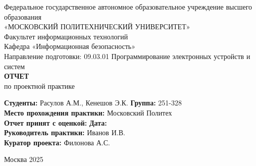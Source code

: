 \documentclass[14pt, a4paper]{extarticle}
\begin{document}
\begin{titlepage}
\begin{center}
    Федеральное государственное автономное образовательное учреждение высшего образования\\
    «МОСКОВСКИЙ ПОЛИТЕХНИЧЕСКИЙ УНИВЕРСИТЕТ»\\[1cm]
    Факультет информационных технологий\\
    Кафедра «Информационная безопасность»\\[1cm]
    Направление подготовки: 09.03.01 Программирование электронных устройств и систем\\[2cm]
    
    {\Large \textbf{ОТЧЕТ}}\\
    {\large по проектной практике}\\[2cm]
\end{center}

\begin{flushleft}
    \textbf{Студенты:} Расулов А.М., Кенешов Э.К. \hspace{1cm} \textbf{Группа:} 251-328\\[0.5cm]
    \textbf{Место прохождения практики:} Московский Политех\\[0.5cm]
    \textbf{Отчет принят с оценкой:} \underline{\hspace{4cm}} \textbf{Дата:} \underline{\hspace{4cm}}\\[0.5cm]
    \textbf{Руководитель практики:} Иванов И.В.\\[0.5cm]
    \textbf{Куратор проекта:} Филонова А.С.\\
\end{flushleft}

\vfill
\begin{center}
    Москва 2025
\end{center}
\end{titlepage}

\tableofcontents
\newpage









\end{document}
